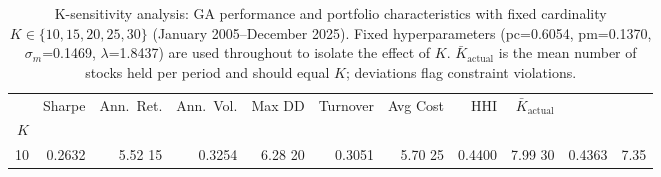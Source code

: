\begin{table}
\caption{K-sensitivity analysis: GA performance and portfolio characteristics with fixed cardinality $K \in \{10, 15, 20, 25, 30\}$ (January 2005--December 2025). Fixed hyperparameters (pc=0.6054, pm=0.1370, $\sigma_m$=0.1469, $\lambda$=1.8437) are used throughout to isolate the effect of $K$. $\bar{K}_{\text{actual}}$ is the mean number of stocks held per period and should equal $K$; deviations flag constraint violations.}
\label{tab:k_sensitivity}
\begin{tabular}{rrrrrrrrr}
\toprule
 & Sharpe & Ann.~Ret. & Ann.~Vol. & Max DD & Turnover & Avg Cost & HHI & $\bar{K}_{\text{actual}}$ \\
$K$ &  &  &  &  &  &  &  &  \\
 & 0.2632 & 5.52%
15 & 0.3254 & 6.28%
20 & 0.3051 & 5.70%
25 & 0.4400 & 7.99%
30 & 0.4363 & 7.35%
\bottomrule
\end{tabular}
\end{table}
